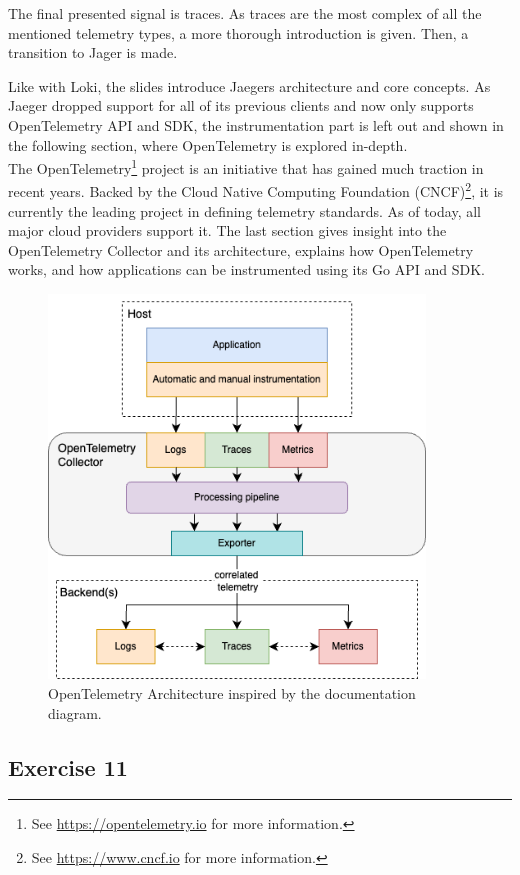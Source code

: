 \documentclass[
  digital,
  color,
  oneside,
  nosansbold,
  nocolorbold,
  lof,
  lot,
]{fithesis4}
\begin{document}
The final presented signal is traces. As traces are the most complex of all the mentioned telemetry types, a more thorough introduction is given. Then, a transition to Jager is made.

Like with Loki, the slides introduce Jaegers architecture and core concepts. As Jaeger dropped support for all of its previous clients and now only supports OpenTelemetry API and SDK, the instrumentation part is left out and shown in the following section, where OpenTelemetry is explored in-depth. \\

The OpenTelemetry\footnote{See \url{https://opentelemetry.io} for more information.}
project is an initiative that has gained much traction in recent years. Backed by the Cloud Native Computing Foundation (CNCF)\footnote{See \url{https://www.cncf.io} for more information.},
it is currently the leading project in defining telemetry standards. As of today, all major cloud providers support it. The last section gives insight into the OpenTelemetry Collector and its architecture, explains how OpenTelemetry works, and how applications can be instrumented using its Go API and SDK.

\begin{figure}[H]
    \centering
    \includegraphics[width=10cm]{figures/opentelemetry-architecture.png}
    \caption{OpenTelemetry Architecture inspired by the documentation diagram.}
\end{figure}

\subsection{Exercise 11}
\end{document}

